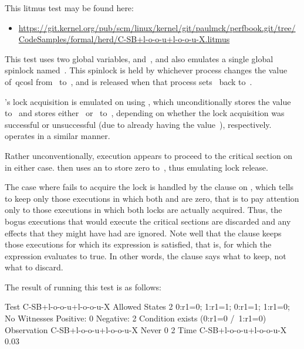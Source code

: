 This litmus test may be found here:

\begin{itemize}
\item \url{https://git.kernel.org/pub/scm/linux/kernel/git/paulmck/perfbook.git/tree/CodeSamples/formal/herd/C-SB+l-o-o-u+l-o-o-u-X.litmus}
\end{itemize}

This test uses two global variables,  and~, and also
emulates a single global spinlock named~.
This spinlock is held by whichever process changes the value of~qco{sl}
from~ to~, and is released when that process sets~
back to~.
\begin{fcvref}
's lock acquisition is emulated on  using
, which unconditionally stores the value~ to~
and stores either~ or~ to~, depending on whether
the lock acquisition was successful or unsuccessful (due to  already
having the value~), respectively.
 operates in a similar manner.

Rather unconventionally, execution appears to proceed to the critical
section on  in either case.
 then uses an  to store zero
to~, thus emulating lock release.

The case where  fails to acquire the lock is handled by
the  clause on , which tells  to keep
only those executions in which both  and  are zero,
that is to pay attention only to those executions in which both locks
are actually acquired.
Thus, the bogus executions that would execute the critical sections are
discarded and any effects that they might have had are ignored.
Note well that the  clause keeps those executions for which
its expression is satisfied, that is, for which the expression evaluates
to true.
In other words, the  clause says what to keep, not what to discard.
\end{fcvref}

The result of running this test is as follows:

\begin{fcvlabel}
\begin{VerbatimN}[commandchars=\%\@\$]
	Test C-SB+l-o-o-u+l-o-o-u-X Allowed
	States 2
	0:r1=0; 1:r1=1;
	0:r1=1; 1:r1=0;
	No
	Witnesses
	Positive: 0 Negative: 2
	Condition exists (0:r1=0 /\ 1:r1=0)
	Observation C-SB+l-o-o-u+l-o-o-u-X Never 0 2   %
	Time C-SB+l-o-o-u+l-o-o-u-X 0.03
\end{VerbatimN}
\end{fcvlabel}

